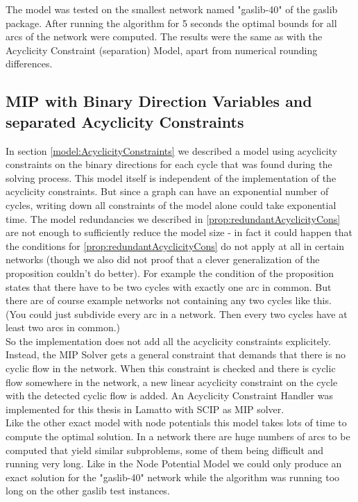 The model was tested on the smallest network named "gaslib-40" of the gaslib package. After running the algorithm for 5 
seconds the optimal bounds for all arcs of the network were computed. The results were the same as with the Acyclicity 
Constraint (separation) Model, apart from numerical rounding differences. \\



\subsection{MIP with Binary Direction Variables and separated Acyclicity Constraints}
In section \ref{model:AcyclicityConstraints} we described a model using acyclicity constraints on the binary directions 
for each cycle that was found during the solving process.
This model itself is independent of the implementation of the acyclicity constraints. But since a graph can have an 
exponential number of cycles, writing down all constraints of the model alone could take exponential time. The 
model redundancies we described in \ref{prop:redundantAcyclicityCons} are not enough to sufficiently reduce the model 
size - in fact it could happen that the conditions for \ref{prop:redundantAcyclicityCons} do not apply at all in 
certain networks (though we also did not proof that a clever generalization of the proposition couldn't do better). 
For example the condition of the proposition states that there have to be two cycles with exactly one arc in common. 
But there are of course example networks not containing any two cycles like this. (You could just subdivide every arc 
in a network. Then every two cycles have at least two arcs in common.)\\

So the implementation does not add all the acyclicity constraints explicitely. Instead, the MIP Solver gets a 
general constraint that demands that there is no cyclic flow in the network. When this constraint is checked and there 
is cyclic flow somewhere in the network, a new linear acyclicity constraint on the cycle with the detected cyclic flow 
is added. An Acyclicity Constraint Handler was implemented for this thesis in Lamatto with SCIP as MIP solver. \\

Like the other exact model with node potentials this model takes lots of time to compute the optimal solution. In 
a network there are huge numbers of arcs to be computed that yield similar subproblems, some of them being 
difficult and running very long. Like in the Node Potential Model we could only produce an exact solution for the 
"gaslib-40" network while the algorithm was running too long on the other gaslib test instances.

